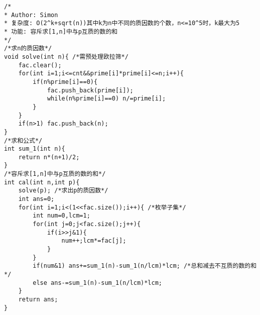 \begin{lstlisting}
/*
* Author: Simon
* 复杂度: O(2^k+sqrt(n))其中k为n中不同的质因数的个数，n<=10^5时，k最大为5
* 功能: 容斥求[1,n]中与p互质的数的和
*/ 
/*求n的质因数*/
void solve(int n){ /*需预处理欧拉筛*/
	fac.clear();
	for(int i=1;i<=cnt&&prime[i]*prime[i]<=n;i++){
		if(n%prime[i]==0){
			fac.push_back(prime[i]);
			while(n%prime[i]==0) n/=prime[i];
		}
	}
	if(n>1) fac.push_back(n);
}
/*求和公式*/
int sum_1(int n){
	return n*(n+1)/2;
}
/*容斥求[1,n]中与p互质的数的和*/
int cal(int n,int p){
	solve(p); /*求出p的质因数*/
	int ans=0;
	for(int i=1;i<(1<<fac.size());i++){ /*枚举子集*/
		int num=0,lcm=1;
		for(int j=0;j<fac.size();j++){
			if(i>>j&1){
				num++;lcm*=fac[j];	
			}
		}
		if(num&1) ans+=sum_1(n)-sum_1(n/lcm)*lcm; /*总和减去不互质的数的和*/
		else ans-=sum_1(n)-sum_1(n/lcm)*lcm;
	}
	return ans;
}
\end{lstlisting}